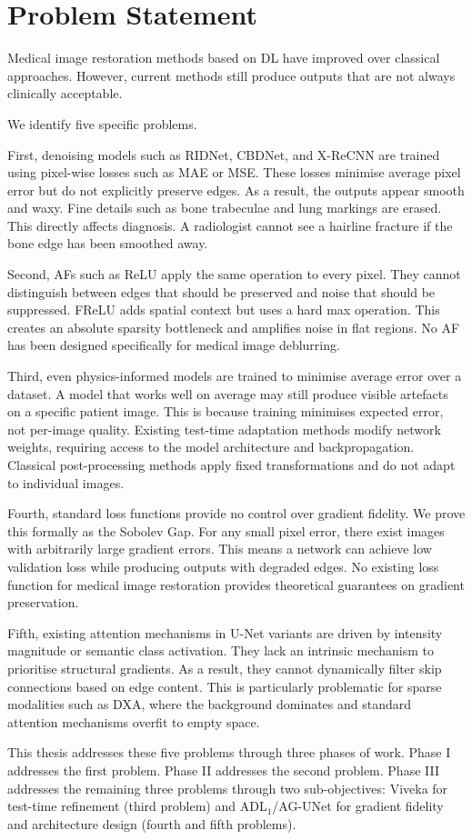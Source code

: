 
\section{Problem Statement}
\label{sec:rq}
Medical image restoration methods based on DL have improved over classical approaches. However, current methods still produce outputs that are not always clinically acceptable.

We identify five specific problems.

{First}, denoising models such as RIDNet, CBDNet, and X-ReCNN are trained using pixel-wise losses such as MAE or MSE. These losses minimise average pixel error but do not explicitly preserve edges. As a result, the outputs appear smooth and waxy. Fine details such as bone trabeculae and lung markings are erased. This directly affects diagnosis. A radiologist cannot see a hairline fracture if the bone edge has been smoothed away.

{Second}, AFs such as ReLU apply the same operation to every pixel. They cannot distinguish between edges that should be preserved and noise that should be suppressed. FReLU adds spatial context but uses a hard max operation. This creates an absolute sparsity bottleneck and amplifies noise in flat regions. No AF has been designed specifically for medical image deblurring.

{Third}, even physics-informed models are trained to minimise average error over a dataset. A model that works well on average may still produce visible artefacts on a specific patient image. This is because training minimises expected error, not per-image quality. Existing test-time adaptation methods modify network weights, requiring access to the model architecture and backpropagation. Classical post-processing methods apply fixed transformations and do not adapt to individual images.

Fourth, standard loss functions provide no control over gradient fidelity. We prove this formally as the Sobolev Gap. For any small pixel error, there exist images with arbitrarily large gradient errors. This means a network can achieve low validation loss while producing outputs with degraded edges. No existing loss function for medical image restoration provides theoretical guarantees on gradient preservation.

{Fifth}, existing attention mechanisms in U-Net variants are driven by intensity magnitude or semantic class activation. They lack an intrinsic mechanism to prioritise structural gradients. As a result, they cannot dynamically filter skip connections based on edge content. This is particularly problematic for sparse modalities such as DXA, where the background dominates and standard attention mechanisms overfit to empty space.

This thesis addresses these five problems through three phases of work. Phase I addresses the first problem. Phase II addresses the second problem. Phase III addresses the remaining three problems through two sub-objectives: Viveka for test-time refinement (third problem) and ADL\(_1\)/AG-UNet for gradient fidelity and architecture design (fourth and fifth problems).

